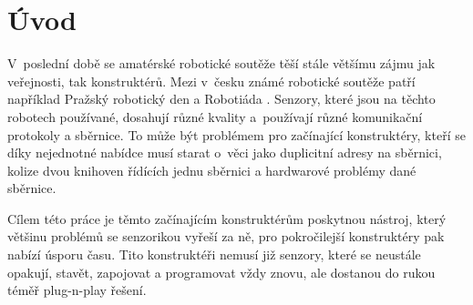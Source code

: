 \chapter*{Úvod}
V~poslední době se amatérské robotické soutěže těší stále většímu zájmu jak veřejnosti, tak konstruktérů.
Mezi v~česku známé robotické soutěže patří například Pražský robotický den \cite{Prague-robotic-day} a Robotiáda \cite{Robotiada}.
Senzory, které jsou na těchto robotech používané, dosahují různé kvality a~používají různé komunikační protokoly a sběrnice. To může být problémem pro začínající konstruktéry, kteří se díky nejednotné nabídce musí starat o~věci jako duplicitní adresy na sběrnici, kolize dvou knihoven řídících jednu sběrnici a hardwarové problémy dané sběrnice.

Cílem této práce je těmto začínajícím konstruktérům poskytnou nástroj, který většinu problémů se senzorikou vyřeší za ně, pro pokročilejší konstruktéry pak nabízí úsporu času.
Tito konstruktéři nemusí již senzory, které se neustále opakují, stavět, zapojovat a programovat vždy znovu, ale dostanou do rukou téměř plug-n-play řešení.


\newpage
